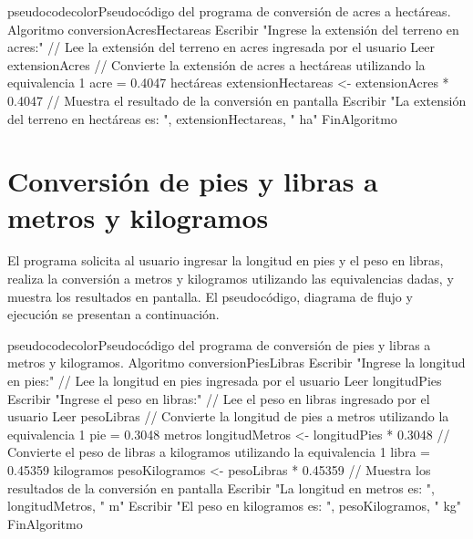 \begin{sourcecode}{pseudocodecolor}{Pseudocódigo del programa de conversión de acres a hectáreas.}
Algoritmo conversionAcresHectareas
    Escribir "Ingrese la extensión del terreno en acres:"
    // Lee la extensión del terreno en acres ingresada por el usuario
    Leer extensionAcres
    // Convierte la extensión de acres a hectáreas utilizando la equivalencia 1 acre = 0.4047 hectáreas
    extensionHectareas <- extensionAcres * 0.4047
    // Muestra el resultado de la conversión en pantalla
    Escribir "La extensión del terreno en hectáreas es: ", extensionHectareas, " ha"
FinAlgoritmo
\end{sourcecode}


%
\section{Conversión de pies y libras a metros y kilogramos}

El programa solicita al usuario ingresar la longitud en pies y el peso en libras, realiza la conversión a metros y kilogramos utilizando las equivalencias dadas, y muestra los resultados en pantalla. El pseudocódigo, diagrama de flujo y ejecución se presentan a continuación.

\begin{sourcecode}{pseudocodecolor}{Pseudocódigo del programa de conversión de pies y libras a metros y kilogramos.}
Algoritmo conversionPiesLibras
    Escribir "Ingrese la longitud en pies:"
    // Lee la longitud en pies ingresada por el usuario
    Leer longitudPies
    Escribir "Ingrese el peso en libras:"
    // Lee el peso en libras ingresado por el usuario
    Leer pesoLibras
    // Convierte la longitud de pies a metros utilizando la equivalencia 1 pie = 0.3048 metros
    longitudMetros <- longitudPies * 0.3048
    // Convierte el peso de libras a kilogramos utilizando la equivalencia 1 libra = 0.45359 kilogramos
    pesoKilogramos <- pesoLibras * 0.45359
    // Muestra los resultados de la conversión en pantalla
    Escribir "La longitud en metros es: ", longitudMetros, " m"
    Escribir "El peso en kilogramos es: ", pesoKilogramos, " kg"
FinAlgoritmo
\end{sourcecode}


